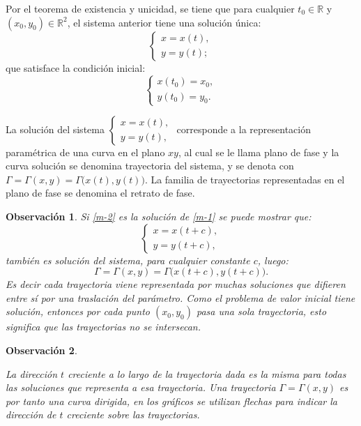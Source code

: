 \documentclass[a5paper,doc,10pt,noapacite]{apa6}
\newcommand{\R}{\mathbb{R}}
\newtheorem{observ}{Observación}
\begin{document}
{{Por el teorema de existencia y unicidad, se tiene que para cualquier \(t_0\in\R\) y \((x_0,y_0)\in\R^2\), el sistema anterior tiene una solución única: 
\begin{equation}\label{m-2}
	\begin{cases}
		x=x(t),	
		 \\
		y = y(t);
	\end{cases}
\end{equation}
que satisface la condición inicial: 
\[
	\begin{cases}
		x(t_0)=x_0,
		 \\
		y(t_0) = y_0.
	\end{cases}
\]

La solución del sistema \(\begin{cases}	x=x(t),	\\		y = y(t),	\end{cases}\) \hspace{-1em} corresponde a la representación paramétrica de una curva en el plano \(xy\), al cual se le llama plano de fase y la curva solución se denomina trayectoria del sistema, y se denota con \(\Gamma=\Gamma(x,y)=\Gamma\big(x(t),y(t)\big)\). La familia de trayectorias representadas en el plano de fase se denomina el retrato de fase.
	
\begin{observ}
	Si \eqref{m-2} es la solución de \eqref{m-1} se puede mostrar que:
	\begin{equation}\label{m-2}
	\begin{cases}
		x=x(t+c),	
		 \\
		y = y(t+c),
	\end{cases}
	\end{equation}
	también es solución del sistema, para cualquier constante \(c\), luego:
	\[
	\Gamma=\Gamma(x,y)=\Gamma\big(x(t+c),y(t+c)\big).
	\]
	Es decir cada trayectoria viene representada por muchas soluciones que difieren entre sí por una traslación del parámetro. Como el problema de valor inicial tiene solución, entonces por cada punto \((x_0,y_0)\) pasa una sola trayectoria, esto significa que las trayectorias no se intersecan.
\end{observ}

\begin{observ}\quad
	\begin{APAenumerate}
		\item La dirección \(t\) creciente a lo largo de la trayectoria dada es la misma para todas las soluciones que representa a esa trayectoria. Una trayectoria \(\Gamma=\Gamma(x,y)\)  es por tanto una curva dirigida, en los gráficos se utilizan flechas para indicar la dirección de \(t\) creciente sobre las trayectorias.
		

\end{APAenumerate}
\end{observ}}}
\end{document}
